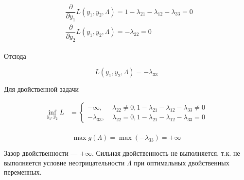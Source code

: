 	\begin{align}
	\begin{aligned}
	&\dfrac{\partial}{\partial y_1} L(y_1,y_2, \Lambda) =  1 -  \lambda_{21} - \lambda_{12} - \lambda_{33} = 0 \\
	&\dfrac{\partial}{\partial y_2} L(y_1,y_2, \Lambda) = - \lambda_{22} = 0 
	\end{aligned}
	\end{align}
	
	Отсюда
	
	\begin{equation}
	 L(y_1,y_2, \Lambda) = -\lambda_{33}
	\end{equation}
	
	Для двойственной задачи 

	\begin{align}
	\inf_{y_1,y_2} L &=
	\left\{
	\begin{aligned}
	-\infty ,\; & \lambda_{22} \neq 0, 1 -  \lambda_{21} - \lambda_{12} - \lambda_{33} \neq 0\\
	-\lambda_{33} ,\;  &\lambda_{22} = 0, 1 -  \lambda_{21} - \lambda_{12} - \lambda_{33} = 0
	\end{aligned}
	\right. \\
	\end{align}
	
	\begin{equation}
	\max g(\Lambda) = \max (-\lambda_{33}) = +\infty
	\end{equation}
	
	Зазор двойственности --- $+\infty$. Сильная двойственность не выполняется, т.к. не выполняется условие неотрицательности $\Lambda$ при оптимальных двойственных переменных.
		



